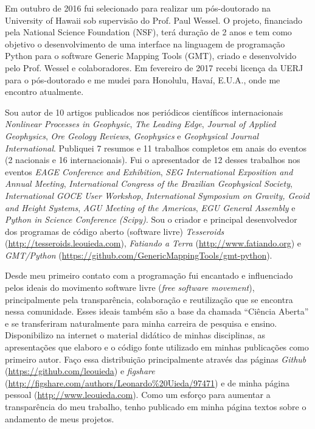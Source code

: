 Em outubro de 2016 fui selecionado para realizar um pós-doutorado na University
of Hawaii sob supervisão do Prof. Paul Wessel.
O projeto, financiado pela National Science Foundation (NSF), terá duração de 2
anos e tem como objetivo o desenvolvimento de uma interface na linguagem de
programação Python para o software Generic Mapping Tools (GMT), criado e
desenvolvido pelo Prof. Wessel e colaboradores.
Em fevereiro de 2017 recebi licença da UERJ para o pós-doutorado e me mudei
para Honolulu, Havaí, E.U.A., onde me encontro atualmente.

Sou autor de 10 artigos publicados nos periódicos científicos internacionais
{\em Nonlinear Processes in Geophysic},
{\em The Leading Edge},
{\em Journal of Applied Geophysics},
{\em Ore Geology Reviews},
{\em Geophysics} e
{\em Geophysical Journal International}.
Publiquei 7 resumos e 11 trabalhos completos em anais do eventos (2 nacionais e
16 internacionais).
Fui o apresentador de 12 desses trabalhos nos eventos
{\em EAGE Conference and Exhibition},
{\em SEG International Exposition and Annual Meeting},
{\em International Congress of the Brazilian Geophysical Society},
{\em International GOCE User Workshop},
{\em International Symposium on Gravity, Geoid and Height Systems},
{\em AGU Meeting of the Americas},
{\em EGU General Assembly} e
{\em Python in Science Conference (Scipy)}.
Sou o criador e principal desenvolvedor dos programas de código aberto
(software livre)
{\em Tesseroids} (\url{http://tesseroids.leouieda.com}),
{\em Fatiando a Terra} (\url{http://www.fatiando.org}) e
{\em GMT/Python} (\url{https://github.com/GenericMappingTools/gmt-python}).


Desde meu primeiro contato com a programação fui encantado e influenciado pelos
ideais do movimento software livre ({\em free software movement}),
principalmente pela transparência, colaboração e reutilização que se encontra
nessa comunidade.
Esses ideais também são a base da chamada ``Ciência Aberta'' e se transferiram
naturalmente para minha carreira de pesquisa e ensino.
Disponibilizo na internet o material didático de minhas disciplinas, as
apresentações que elaboro e o código fonte utilizado em minhas publicações como
primeiro autor.
Faço essa distribuição principalmente através das páginas
{\em Github} (\url{https://github.com/leouieda}) e
{\em figshare} (\url{http://figshare.com/authors/Leonardo%20Uieda/97471})
e de minha página pessoal (\url{http://www.leouieda.com}).
Como um esforço para aumentar a transparência do meu trabalho, tenho publicado
em minha página textos sobre o andamento de meus projetos.

